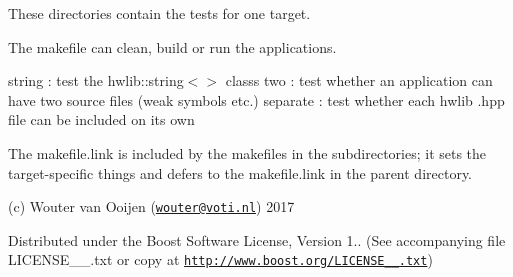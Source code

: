 These directories contain the tests for one target.

The makefile can clean, build or run the applications.

string \+: test the hwlib\+::string$<$$>$ classs two \+: test whether an application can have two source files (weak symbols etc.) separate \+: test whether each hwlib .hpp file can be included on its own

The makefile.\+link is included by the makefiles in the subdirectories; it sets the target-\/specific things and defers to the makefile.\+link in the parent directory.

(c) Wouter van Ooijen (\href{mailto:wouter@voti.nl}{\tt wouter@voti.\+nl}) 2017

Distributed under the Boost Software License, Version 1.. (See accompanying file L\+I\+C\+E\+N\+S\+E\+\_\+\_.\+txt or copy at \href{http://www.boost.org/LICENSE_1_0.txt}{\tt http\+://www.\+boost.\+org/\+L\+I\+C\+E\+N\+S\+E\+\_\+\_.\+txt}) 